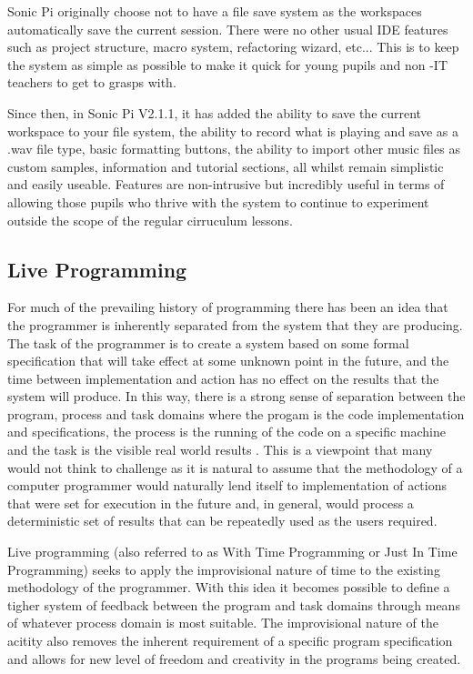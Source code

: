 \documentclass[11pt]{scrartcl}
\begin{document}
Sonic Pi originally choose not to have a file save system as the workspaces 
automatically save the current session. There were no other usual IDE features 
such as project structure, macro system, refactoring wizard, etc... This is to 
keep the system as simple as possible to make it quick for young pupils and non
-IT teachers to get to grasps with.

Since then, in Sonic Pi V2.1.1, it has added the ability to save the current 
workspace to your file system, the ability to record what is playing and save 
as a .wav file type, basic formatting buttons, the ability to import other 
music files as custom samples, information and tutorial sections, all whilst 
remain simplistic and easily useable. Features are non-intrusive but 
incredibly useful in terms of allowing those pupils who thrive with the system 
to continue to experiment outside the scope of the regular cirruculum lessons.

\subsection{Live Programming}
For much of the prevailing history of programming there has been an idea that 
the programmer is inherently separated from the system that they are 
producing. The task of the programmer is to create a system based on some 
formal specification that will take effect at some unknown point in the 
future, and the time between implementation and action has no effect on the 
results that the system will produce. In this way, there is a strong sense of 
separation between the program, process and task domains where the progam is 
the code implementation and specifications, the process is the running of the 
code on a specific machine and the task is the visible real world results
\cite{SG10}. This is a viewpoint that many would not think to challenge as it 
is natural to assume that the methodology of a computer programmer would 
naturally lend itself to implementation of actions that were set for execution 
in the future and, in general, would process a deterministic set of results 
that can be repeatedly used as the users required.

Live programming (also referred to as With Time Programming or Just In Time 
Programming) seeks to apply the improvisional nature of time to the existing 
methodology of the programmer. With this idea it becomes possible to define a 
tigher system of feedback between the program and task domains through means 
of whatever process domain is most suitable. The improvisional nature of the 
acitity also removes the inherent requirement of a specific program 
specification and allows for new level of freedom and creativity in the 
programs being created. 
\end{document}
